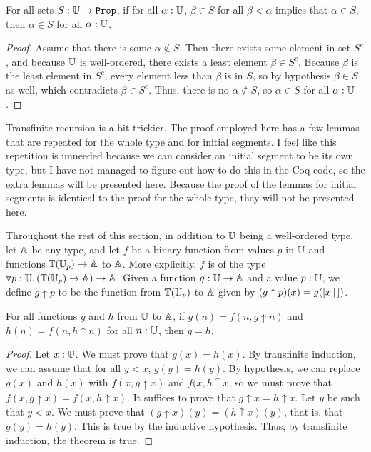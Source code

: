 \documentclass[../math.tex]{subfiles}
\begin{document}
\begin{theorem} \label{transfinite-induction}
    For all sets $S : \set{\U}$, if for all $\alpha : \mathbb{U}$, $\beta \in S$ for all
    $\beta < \alpha$ implies that $\alpha \in S$, then $\alpha \in S$ for all
    $\alpha : \mathbb{U}$.
\end{theorem}
\begin{proof}
    Assume that there is some $\alpha \notin S$.  Then there exists some element
    in set $S^c$, and because $\mathbb{U}$ is well-ordered, there exists a least element
    $\beta \in S^c$.  Because $\beta$ is the least element in $S^c$, every
    element less than $\beta$ is in $S$, so by hypothesis $\beta \in S$ as well,
    which contradicts $\beta \in S^c$.  Thus, there is no $\alpha \notin S$, so
    $\alpha \in S$ for all $\alpha : \mathbb{U}$.
\end{proof}

Transfinite recursion is a bit trickier.  The proof employed here has a few
lemmas that are repeated for the whole type and for initial segments.  I feel
like this repetition is unneeded because we can consider an initial segment to
be its own type, but I have not managed to figure out how to do this in the Coq
code, so the extra lemmas will be presented here.  Because the proof of the
lemmas for initial segments is identical to the proof for the whole type, they
will not be presented here.

Throughout the rest of this section, in addition to $\mathbb{U}$ being a well-ordered
type, let $\mathbb{A}$ be any type, and let $f$ be a binary function from values $p$ in
$\mathbb{U}$ and functions $\mathbb{T}(\mathbb{U}_p) \to \mathbb{A}$ to $\mathbb{A}$.  More explicitly, $f$ is of the
type $\forall p : \mathbb{U}, (\mathbb{T}(\mathbb{U}_p) \to \mathbb{A}) \to \mathbb{A}$.  Given a function $g : \mathbb{U} \to
\mathbb{A}$ and a value $p : \mathbb{U}$, we define $g \uparrow p$ to be the function from
$\mathbb{T}(\mathbb{U}_p)$ to $\mathbb{A}$ given by $(g \uparrow p)(x) = g([ x\, |\,])$.

\begin{theorem}
    For all functions $g$ and $h$ from $\mathbb{U}$ to $\mathbb{A}$, if $g(n) = f(n, g \uparrow
    n)$ and $h(n) = f(n, h \uparrow n)$ for all $n : \mathbb{U}$, then $g = h$.
\end{theorem}
\begin{proof}
    Let $x : \mathbb{U}$.  We must prove that $g(x) = h(x)$.  By transfinite induction,
    we can assume that for all $y < x$, $g(y) = h(y)$.  By hypothesis, we can
    replace $g(x)$ and $h(x)$ with $f(x, g \uparrow x)$ and $f(x, h \uparrow x$,
    so we must prove that $f(x, g \uparrow x) = f(x, h \uparrow x)$.  It
    suffices to prove that $g \uparrow x = h \uparrow x$.  Let $y$ be such that
    $y < x$.  We must prove that $(g \uparrow x)(y) = (h \uparrow x)(y)$, that
    is, that $g(y) = h(y)$.  This is true by the inductive hypothesis.  Thus, by
    transfinite induction, the theorem is true.
\end{proof}
\end{document}
